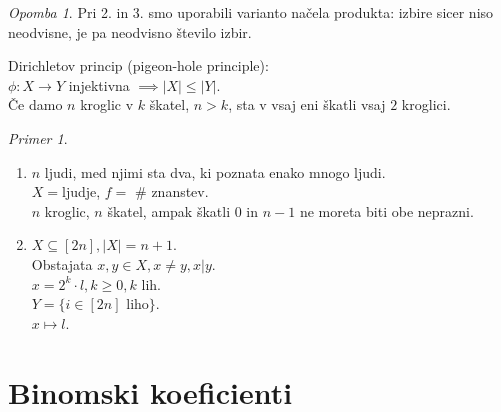 \documentclass[a4paper, 12pt]{book}
\theoremstyle{definition}
\theoremstyle{remark}
\newtheorem*{ex}{Primer}
\newtheorem*{rem}{Opomba}
\begin{document}
\begin{rem}
  Pri 2. in 3. smo uporabili varianto načela produkta: izbire sicer niso neodvisne, je pa neodvisno število izbir.
\end{rem}
Dirichletov princip (pigeon-hole principle): \\
$\phi: X \to Y$ injektivna $\implies |X| \leq |Y|$. \\
Če damo $n$ kroglic v $k$ škatel, $n > k$, sta v vsaj eni škatli vsaj $2$ kroglici.
\begin{ex} \text{}
  \begin{enumerate}[label=(\arabic{*})]
    \item $n$ ljudi, med njimi sta dva, ki poznata enako mnogo ljudi. \\
      $X =$ljudje, $f=$ \# znanstev. \\
      $n$ kroglic, $n$ škatel, ampak škatli $0$ in $n-1$ ne moreta biti obe neprazni.
    \item $X \subseteq [2n], |X| = n+1$. \\
      Obstajata $x,y \in X, x \neq y, x|y$. \\
      $x = 2^k \cdot l, k \geq 0, k$ lih. \\
      $Y = \{i \in [2n]$ liho$\}$. \\
      $x \mapsto l$.
  \end{enumerate}
\end{ex}


\section{Binomski koeficienti}
\end{document}
